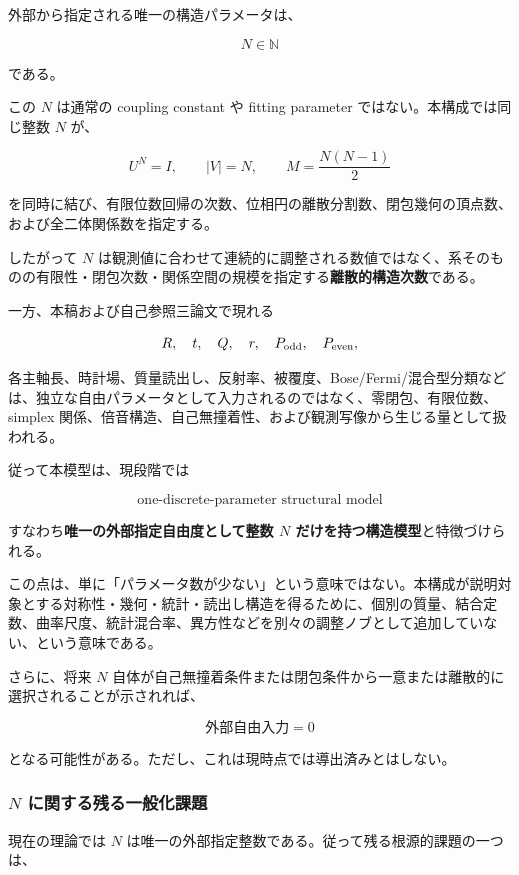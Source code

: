\documentclass[
  a4paper,
]{ltjsarticle}
\begin{document}
外部から指定される唯一の構造パラメータは、

\[
\boxed{N\in\mathbb N}
\]

である。

この \(N\) は通常の coupling constant や fitting parameter
ではない。本構成では同じ整数 \(N\) が、

\[
\boxed{
U^N=I,\qquad
|V|=N,\qquad
M=\frac{N(N-1)}2
}
\]

を同時に結び、有限位数回帰の次数、位相円の離散分割数、閉包幾何の頂点数、および全二体関係数を指定する。

したがって \(N\)
は観測値に合わせて連続的に調整される数値ではなく、系そのものの有限性・閉包次数・関係空間の規模を指定する\textbf{離散的構造次数}である。

一方、本稿および自己参照三論文で現れる

\[
R,\quad t,\quad Q,\quad
r,\quad
P_{\rm odd},\quad P_{\rm even},
\]

各主軸長、時計場、質量読出し、反射率、被覆度、Bose/Fermi/混合型分類などは、独立な自由パラメータとして入力されるのではなく、零閉包、有限位数、simplex
関係、倍音構造、自己無撞着性、および観測写像から生じる量として扱われる。

従って本模型は、現段階では

\[
\boxed{
\text{one-discrete-parameter structural model}
}
\]

すなわち\textbf{唯一の外部指定自由度として整数 \(N\)
だけを持つ構造模型}と特徴づけられる。

この点は、単に「パラメータ数が少ない」という意味ではない。本構成が説明対象とする対称性・幾何・統計・読出し構造を得るために、個別の質量、結合定数、曲率尺度、統計混合率、異方性などを別々の調整ノブとして追加していない、という意味である。

さらに、将来 \(N\)
自体が自己無撞着条件または閉包条件から一意または離散的に選択されることが示されれば、

\[
\boxed{
\text{外部自由入力}=0
}
\]

となる可能性がある。ただし、これは現時点では導出済みとはしない。

\subsubsection{\texorpdfstring{\(N\)
に関する残る一般化課題}{N に関する残る一般化課題}}\label{n-ux306bux95a2ux3059ux308bux6b8bux308bux4e00ux822cux5316ux8ab2ux984c}

現在の理論では \(N\)
は唯一の外部指定整数である。従って残る根源的課題の一つは、
\end{document}
